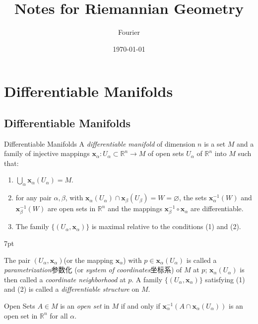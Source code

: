 \documentclass[
	border={25mm 20mm 25mm 30mm},  %
	varwidth,  %
]{standalone}
\title{Notes for Riemannian Geometry}
\author{Fourier}
\date{\today}
\newenvironment{greenformal}{%
\def\FrameCommand{%
\hspace{1pt}%
{\color{greenframeshade}\vrule width 2pt}%
{\color{greenformalshade}\vrule width 4pt}%
\colorbox{greenformalshade}%
}%
\MakeFramed{\advance\hsize-\width\FrameRestore}%
\noindent\hspace{-4.55pt}%
\begin{adjustwidth}{}{7pt}%
\vspace{1pt}\vspace{1pt}%
}
{%
\vspace{5pt}\end{adjustwidth}\endMakeFramed%
}
\begin{document}
\maketitle

\tableofcontents


\section{Differentiable Manifolds}
\subsection{Differentiable Manifolds}
\begin{tips}{Differentiable Manifolds}
    A \textsl{differentiable manifold} of dimension \(n\) is a set \(M\) and a family of injective mappings \(\mathbf{x}_\alpha:U_\alpha\subset\mathbb{R}^n\to M\) of open sets \(U_\alpha\) of \(\mathbb{R}^n\) into \(M\) such that:
    \begin{enumerate}[(1)]
        \item \(\bigcup_\alpha{\mathbf{x}_\alpha(U_\alpha)}=M\).
        \item for any pair \(\alpha,\beta\), with \(\mathbf{x}_\alpha(U_\alpha)\cap\mathbf{x}_\beta(U_\beta)=W=\varnothing\), the sets \(\mathbf{x}_\alpha^{-1}(W)\) and \(\mathbf{x}_\beta^{-1}(W)\) are open sets in \(\mathbb{R}^n\) and the mappings \(\mathbf{x}_\beta^{-1}\circ \mathbf{x}_\alpha\) are differentiable.
        \item The family \(\{(U_\alpha,\mathbf{x}_\alpha)\}\) is maximal relative to the conditions (1) and (2).
    \end{enumerate}
\end{tips}

\begin{greenformal}
    The pair \((U_\alpha,\mathbf{x}_\alpha)\)(or the mapping \(\mathbf{x}_\alpha\)) with \(p\in\mathbf{x}_\alpha(U_\alpha)\) is called a \textsl{parametrization}参数化 (or \textsl{system of coordinates}坐标系) of \(M\) at \(p\); \(\mathbf{x}_\alpha(U_\alpha)\) is then called a \textsl{coordinate neighborhood} at \(p\). A family \(\{(U_\alpha,\mathbf{x}_\alpha)\}\) satisfying (1) and (2) is called a \textsl{differentiable structure} on \(M\).
\end{greenformal}

\begin{tips}
    {Open Sets}
    \(A\in M\) is an \textsl{open set} in \(M\) if and only if \(\mathbf{x}_\alpha^{-1}(A\cap\mathbf{x}_\alpha(U_\alpha))\) is an open set in \(\mathbb{R}^n\) for all \(\alpha\).
\end{tips}
\end{document}
